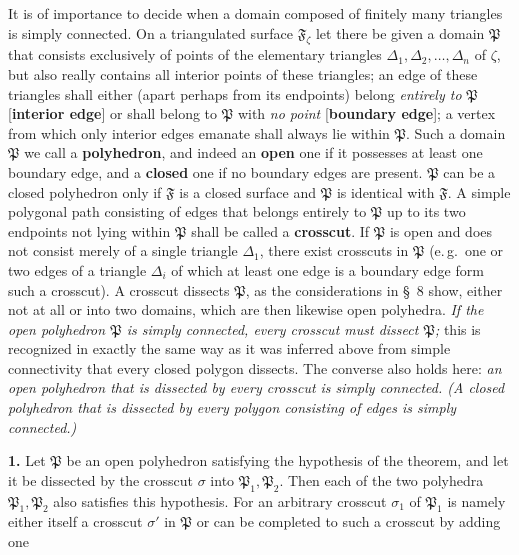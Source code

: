 \documentclass{article}
\begin{document}
It is of importance to decide when a domain composed of finitely many triangles is simply connected. On a triangulated surface $\mathfrak{F}_\zeta$ let there be given a domain $\mathfrak{P}$ that consists exclusively of points of the elementary triangles $\Delta_1, \Delta_2, \dots, \Delta_n$ of $\zeta$, but also really contains all interior points of these triangles; an edge of these triangles shall either (apart perhaps from its endpoints) belong \emph{entirely to} $\mathfrak{P}$ [\textbf{interior edge}] or shall belong to $\mathfrak{P}$ with \emph{no point} [\textbf{boundary edge}]; a vertex from which only interior edges emanate shall always lie within $\mathfrak{P}$. Such a domain $\mathfrak{P}$ we call a \textbf{polyhedron}, and indeed an \textbf{open} one if it possesses at least one boundary edge, and a \textbf{closed} one if no boundary edges are present. $\mathfrak{P}$ can be a closed polyhedron only if $\mathfrak{F}$ is a closed surface and $\mathfrak{P}$ is identical with $\mathfrak{F}$. A simple polygonal path consisting of edges that belongs entirely to $\mathfrak{P}$ up to its two endpoints not lying within $\mathfrak{P}$ shall be called a \textbf{crosscut}. If $\mathfrak{P}$ is open and does not consist merely of a single triangle $\Delta_1$, there exist crosscuts in $\mathfrak{P}$ (e.\,g.\ one or two edges of a triangle $\Delta_i$ of which at least one edge is a boundary edge form such a crosscut). A crosscut dissects $\mathfrak{P}$, as the considerations in §~8 show, either not at all or into two domains, which are then likewise open polyhedra. \emph{If the open polyhedron $\mathfrak{P}$ is simply connected, every crosscut must dissect $\mathfrak{P}$;} this is recognized in exactly the same way as it was inferred above from simple connectivity that every closed polygon dissects. The converse also holds here: \emph{an open polyhedron that is dissected by every crosscut is simply connected. (A closed polyhedron that is dissected by every polygon consisting of edges is simply connected.)}


\textbf{1.} Let $\mathfrak{P}$ be an open polyhedron satisfying the hypothesis of the theorem, and let it be dissected by the crosscut $\sigma$ into $\mathfrak{P}_1, \mathfrak{P}_2$. Then each of the two polyhedra $\mathfrak{P}_1, \mathfrak{P}_2$ also satisfies this hypothesis. For an arbitrary crosscut $\sigma_1$ of $\mathfrak{P}_1$ is namely either itself a crosscut $\sigma'$ in $\mathfrak{P}$ or can be completed to such a crosscut by adding one
\end{document}
